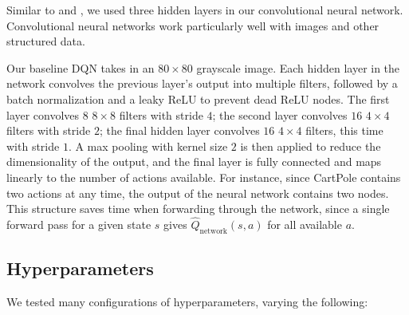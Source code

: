 \documentclass[11pt, twocolumn]{article}
\begin{document}
Similar to \cite{mnih2013playing} and \cite{mnih2015human}, we used three hidden layers in our convolutional neural network. Convolutional neural networks work particularly well with images and other structured data.

Our baseline DQN takes in an $80 \times 80$ grayscale image. Each hidden layer in the network convolves the previous layer's output into multiple filters, followed by a batch normalization and a leaky ReLU to prevent dead ReLU nodes. The first layer convolves $8$ $8 \times 8$ filters with stride $4$; the second layer convolves $16$ $4 \times 4$ filters with stride $2$; the final hidden layer convolves $16$ $4 \times 4$ filters, this time with stride $1$. A max pooling with kernel size $2$ is then applied to reduce the dimensionality of the output, and the final layer is fully connected and  maps linearly to the number of actions available. For instance, since CartPole contains two actions at any time, the output of the neural network contains two nodes. This structure saves time when forwarding through the network, since a single forward pass for a given state $s$ gives $\hat{Q}_\text{network}(s, a)$ for all available $a$.

\subsection{Hyperparameters}

We tested many configurations of hyperparameters, varying the following: 
\end{document}
